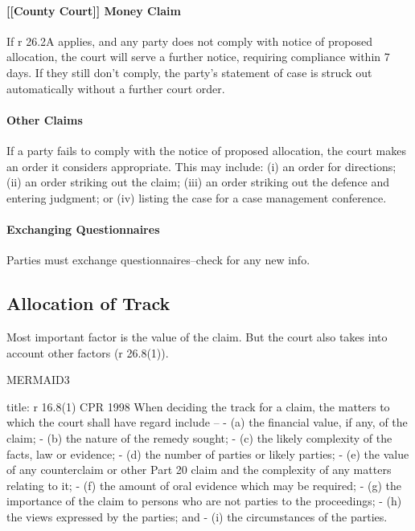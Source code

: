 \documentclass[
]{article}
\newenvironment{Shaded}{}{}
\newcommand{\NormalTok}[1]{#1}
\begin{document}
\hypertarget{county-court-money-claim}{%
\paragraph{{[}{[}County Court{]}{]} Money
Claim}\label{county-court-money-claim}}

If r 26.2A applies, and any party does not comply with notice of
proposed allocation, the court will serve a further notice, requiring
compliance within 7 days. If they still don't comply, the party's
statement of case is struck out automatically without a further court
order.

\hypertarget{other-claims}{%
\paragraph{Other Claims}\label{other-claims}}

If a party fails to comply with the notice of proposed allocation, the
court makes an order it considers appropriate. This may include: (i) an
order for directions; (ii) an order striking out the claim; (iii) an
order striking out the defence and entering judgment; or (iv) listing
the case for a case management conference.

\hypertarget{exchanging-questionnaires}{%
\paragraph{Exchanging Questionnaires}\label{exchanging-questionnaires}}

Parties must exchange questionnaires--check for any new info.

\hypertarget{allocation-of-track}{%
\subsection{Allocation of Track}\label{allocation-of-track}}

Most important factor is the value of the claim. But the court also
takes into account other factors (r 26.8(1)).

MERMAID3

\begin{Shaded}
\begin{Highlighting}[]
\NormalTok{title: r 16.8(1) CPR 1998}
\NormalTok{When deciding the track for a claim, the matters to which the court shall have regard include –}
\NormalTok{{-} (a) the financial value, if any, of the claim;}
\NormalTok{{-} (b) the nature of the remedy sought;}
\NormalTok{{-} (c) the likely complexity of the facts, law or evidence;}
\NormalTok{{-} (d) the number of parties or likely parties;}
\NormalTok{{-} (e) the value of any counterclaim or other Part 20 claim and the complexity of any matters relating to it;}
\NormalTok{{-} (f) the amount of oral evidence which may be required;}
\NormalTok{{-} (g) the importance of the claim to persons who are not parties to the proceedings;}
\NormalTok{{-} (h) the views expressed by the parties; and}
\NormalTok{{-} (i) the circumstances of the parties.}
\end{Highlighting}
\end{Shaded}
\end{document}
